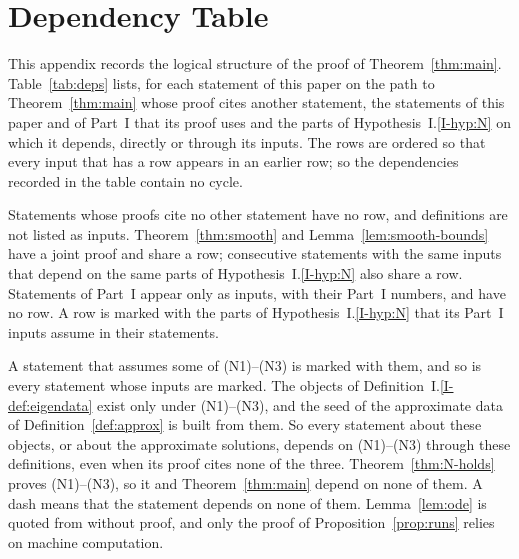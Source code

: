 \section{Dependency Table}
\label{app:deps}

This appendix records the logical structure of the proof of
Theorem~\ref{thm:main}.
Table~\ref{tab:deps} lists, for each statement of this paper on the path to
Theorem~\ref{thm:main} whose proof cites another statement, the statements of
this paper and of Part~I that its proof uses and the parts of
Hypothesis~I.\ref{I-hyp:N} on which it depends,
directly or through its inputs. The rows are ordered so that every input that
has a row appears in an earlier row; so the dependencies recorded in the table
contain no cycle.

Statements whose proofs cite no other statement
have no row, and definitions are not listed as inputs. Theorem~\ref{thm:smooth}
and Lemma~\ref{lem:smooth-bounds} have a joint proof and share a row; consecutive
statements with the same inputs that depend on the same parts of
Hypothesis~I.\ref{I-hyp:N} also share a row.
Statements of Part~I appear only as inputs, with their Part~I numbers, and have
no row. A row is marked with the parts of Hypothesis~I.\ref{I-hyp:N}
that its Part~I inputs assume in their statements.

A statement that assumes some of \textup{(N1)}--\textup{(N3)} is marked with them,
and so is every statement whose inputs are marked. The objects of
Definition~I.\ref{I-def:eigendata} exist only under \textup{(N1)}--\textup{(N3)}, and
the seed of the approximate data of Definition~\ref{def:approx} is built from
them. So every statement about these objects, or about the approximate
solutions, depends on \textup{(N1)}--\textup{(N3)} through these definitions,
even when its proof cites none of the three. Theorem~\ref{thm:N-holds} proves
\textup{(N1)}--\textup{(N3)}, so it and Theorem~\ref{thm:main} depend on none of
them. A dash means that the statement depends on none of them.
Lemma~\ref{lem:ode} is quoted from \cite{Teschl} without proof, and only the proof of
Proposition~\ref{prop:runs} relies on machine computation.

